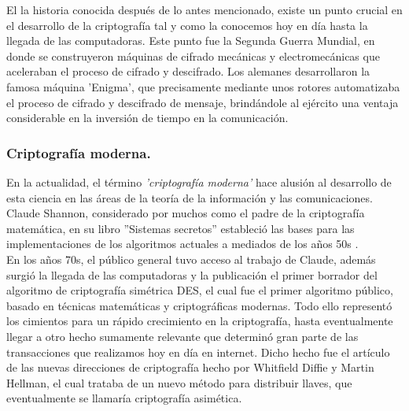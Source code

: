 \documentclass[12pt, a4paper, titlepage]{report}
\begin{document}
                El la historia conocida después de lo antes mencionado, existe un punto crucial en el desarrollo de la criptografía tal y como la conocemos hoy en día hasta la llegada de las computadoras. Este punto fue la Segunda Guerra Mundial, en donde se construyeron máquinas de cifrado mecánicas y electromecánicas que aceleraban el proceso de cifrado y descifrado. Los alemanes desarrollaron la famosa máquina 'Enigma', que precisamente mediante unos rotores automatizaba el proceso de cifrado y descifrado de mensaje, brindándole al ejército una ventaja considerable en la inversión de tiempo en la comunicación.
                
            \subsubsection{Criptografía moderna.}
                En la actualidad, el término \textit{'criptografía moderna'} hace alusión al desarrollo de esta ciencia en las áreas de la teoría de la información y las comunicaciones. Claude Shannon, considerado por muchos como el padre de la criptografía matemática, en su libro ''Sistemas secretos'' estableció las bases para las implementaciones de los algoritmos actuales a mediados de los años 50s \cite{refCriptografia}.\\
                En los años 70s, el público general tuvo acceso al trabajo de Claude, además surgió la llegada de las computadoras y la publicación el primer borrador del algoritmo de criptografía simétrica DES, el cual fue el primer algoritmo público, basado en técnicas matemáticas y criptográficas modernas. Todo ello representó los cimientos para un rápido crecimiento en la criptografía, hasta eventualmente llegar a otro hecho sumamente relevante que determinó gran parte de las transacciones que realizamos hoy en día en internet. Dicho hecho fue el artículo de las nuevas direcciones de criptografía hecho por Whitfield Diffie y Martin Hellman, el cual trataba de un nuevo método para distribuir llaves, que eventualmente se llamaría criptografía asimética.
                
\end{document}
